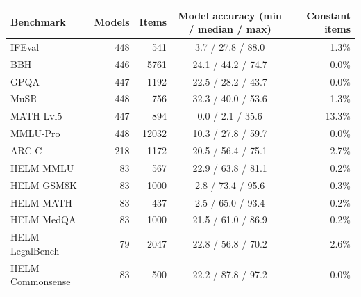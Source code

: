 \begin{tabular}{lrrcr}
\toprule
Benchmark & Models & Items & Model accuracy (min / median / max) & Constant items \\
\midrule
IFEval & 448 & 541 & 3.7 / 27.8 / 88.0 & 1.3\% \\
BBH & 446 & 5761 & 24.1 / 44.2 / 74.7 & 0.0\% \\
GPQA & 447 & 1192 & 22.5 / 28.2 / 43.7 & 0.0\% \\
MuSR & 448 & 756 & 32.3 / 40.0 / 53.6 & 1.3\% \\
MATH Lvl5 & 447 & 894 & 0.0 / 2.1 / 35.6 & 13.3\% \\
MMLU-Pro & 448 & 12032 & 10.3 / 27.8 / 59.7 & 0.0\% \\
ARC-C & 218 & 1172 & 20.5 / 56.4 / 75.1 & 2.7\% \\
\midrule
HELM MMLU & 83 & 567 & 22.9 / 63.8 / 81.1 & 0.2\% \\
HELM GSM8K & 83 & 1000 & 2.8 / 73.4 / 95.6 & 0.3\% \\
HELM MATH & 83 & 437 & 2.5 / 65.0 / 93.4 & 0.2\% \\
HELM MedQA & 83 & 1000 & 21.5 / 61.0 / 86.9 & 0.2\% \\
HELM LegalBench & 79 & 2047 & 22.8 / 56.8 / 70.2 & 2.6\% \\
HELM Commonsense & 83 & 500 & 22.2 / 87.8 / 97.2 & 0.0\% \\
\bottomrule
\end{tabular}
